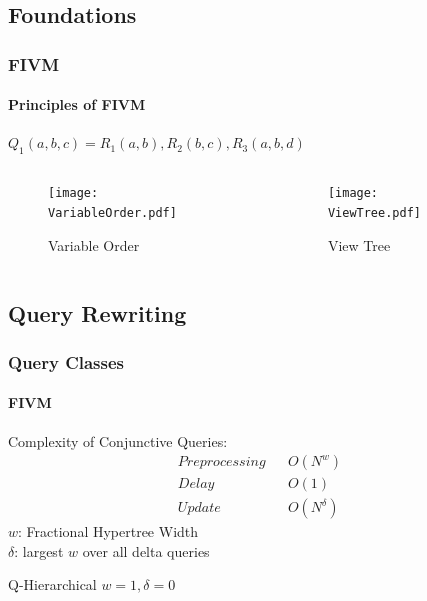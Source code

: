 \documentclass[
	11pt, %
]{beamer}
\begin{document}

\subsection{Foundations}
\begin{frame}
		\frametitle{FIVM}
		\framesubtitle{Principles of FIVM}


		$Q_1(a, b, c) = R_1(a, b), R_2(b, c), R_3(a, b, d)$
		\begin{columns}[c] 
			\begin{column}{0.45\textwidth} 
				\begin{figure}
					\texttt{[image: VariableOrder.pdf]}
					\caption{Variable Order}
				\end{figure}
			\end{column}
			\begin{column}{0.45\textwidth} 
				\begin{figure}
					\texttt{[image: ViewTree.pdf]}
					\caption{View Tree}
				\end{figure}
			\end{column}
		\end{columns}

\end{frame}
\subsection{Query Rewriting}
\begin{frame}
	\frametitle{Query Classes}
	\framesubtitle{FIVM}
	Complexity of Conjunctive Queries:
	\begin{align*}
		Preprocessing & & O(N^w) \\
		Delay & & O(1) \\
		Update & & O(N^\delta)
	\end{align*}
	$w$: Fractional Hypertree Width\\
	$\delta$: largest $w$ over all delta queries
	\begin{block}{Q-Hierarchical}
		$w = 1, \delta=0$ 
	\end{block}
	
\end{frame}
\end{document}
